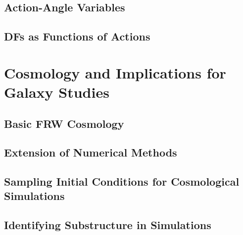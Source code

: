 \subsection{Action-Angle Variables}
\subsection{DFs as Functions of Actions}

\section{Cosmology and Implications for Galaxy Studies} \label{sec:cosmology}
\subsection{Basic FRW Cosmology}
\subsection{Extension of Numerical Methods}
\subsection{Sampling Initial Conditions for Cosmological Simulations}
\subsection{Identifying Substructure in Simulations}






